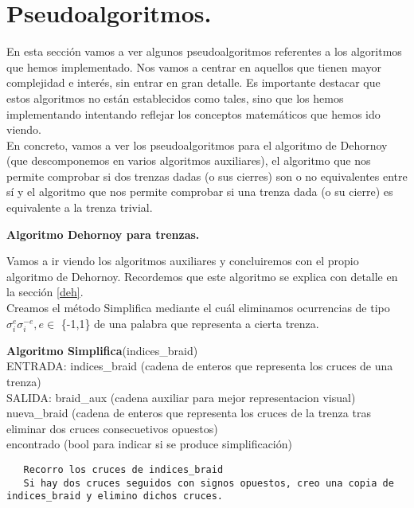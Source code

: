 \newpage
\section{Pseudoalgoritmos.}
En esta sección vamos a ver algunos pseudoalgoritmos referentes a los algoritmos que hemos implementado. Nos vamos a centrar en aquellos que tienen mayor complejidad e interés, sin entrar en gran detalle. Es importante destacar que estos algoritmos no están establecidos como tales, sino que los hemos implementando intentando reflejar los conceptos matemáticos que hemos ido viendo. \\

En concreto, vamos a ver los pseudoalgoritmos para el algoritmo de Dehornoy (que descomponemos en varios algoritmos auxiliares), el algoritmo que nos permite comprobar si dos trenzas dadas (o sus cierres) son o no equivalentes entre sí y el algoritmo que nos permite comprobar si una trenza dada (o su cierre) es equivalente a la trenza trivial.\\

\begin{center}
	\textbf{Algoritmo Dehornoy para trenzas.}
\end{center} 
Vamos a ir viendo los algoritmos auxiliares y concluiremos con el propio algoritmo de Dehornoy. Recordemos que este algoritmo se explica con detalle en la sección \ref{deh}.\\

Creamos el método Simplifica mediante el cuál eliminamos ocurrencias de tipo $\sigma_{i}^{e}\sigma_{i}^{-e}, e \in$ \{-1,1\} de una palabra que representa a cierta trenza. 

\begin{alg}
	\textbf{Algoritmo Simplifica}(indices\_braid)\\
	ENTRADA: indices\_braid (cadena de enteros que representa los cruces de una trenza)\\
	SALIDA: \hspace{0.4cm} braid\_aux (cadena auxiliar para mejor representacion visual) \\
    \hspace*{2.2cm} nueva\_braid (cadena de enteros que representa los cruces de la trenza tras eliminar dos cruces consecuetivos opuestos)\\
    \hspace*{2.2cm} encontrado (bool para indicar si se produce simplificación)
	
\begin{lstlisting}
   Recorro los cruces de indices_braid
   Si hay dos cruces seguidos con signos opuestos, creo una copia de indices_braid y elimino dichos cruces. 
\end{lstlisting}
\end{alg}

